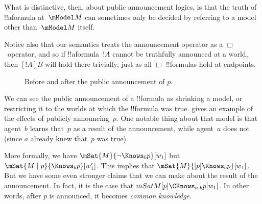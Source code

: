 \documentclass[../../../include/open-logic-section]{subfiles}
\begin{document}
What is distinctive, then, about public announcement logics, is that
the truth of !!a{formula} at~$\mModel M$ can sometimes only be decided
by referring to a model other than~$\mModel M$ itself.

Notice also that our semantics treats the announcement operator as a
$\Box$~operator, and so if !!a{formula}~$!A$ cannot be truthfully
announced at a world, then $[!A]B$ will hold there trivially, just as
all $\Box$ !!{formula}s hold at endpoints. 

\begin{figure}
  \begin{center}
  \end{center}
  \caption{Before and after the public announcement of $p$.}
\end{figure}

We can see the public announcement of a !!{formula} as shrinking a
model, or restricting it to the worlds at which the !!{formula} was
true.  gives an example of the effects
of publicly announcing~$p$. One notable thing about that model is that
agent~$b$ learns that~$p$ as a result of the announcement, while
agent~$a$ does not (since $a$ already knew that~$p$ was true).

More formally, we have $\mSat{M}{\lnot \Knows_b p}[w_1]$ but $\mSat{M
\mid p}{\Knows_b p}[w'_1]$. This implies that $\mSat{M}{[p] \Knows_b
p}[w_1]$. But we have some even stronger claims that we can make about
the result of the announcement. In fact, it is the case that
$mSat{M}{[p]\CKnows_{a,b} p}[w_1]$. In other words, after $p$ is
announced, it becomes \emph{common knowledge}.
\end{document}
